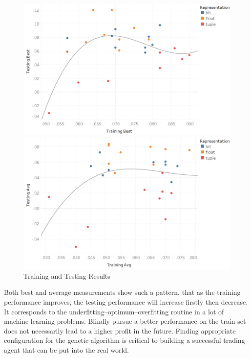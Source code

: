 \documentclass{article}
\begin{document}
\begin{figure}[H]
    \centering
        \begin{minipage}[t]{0.49\textwidth}
            \centering
            \includegraphics[width=\textwidth]{best.png}
        \end{minipage}
        \begin{minipage}[t]{0.49\textwidth}
            \centering
            \includegraphics[width=\textwidth]{avg.png}
        \end{minipage}
        \caption{Training and Testing Results}
\end{figure}

Both best and average measurements show such a pattern,
that as the training performance improves,
the testing performance will increase firstly then decrease.
It corresponds to the underfitting--optimum--overfitting routine in a lot of machine learning problems.
Blindly pursue a better performance on the train set does not necessarily lead to
a higher profit in the future.
Finding appropriate configuration for the genetic algorithm is critical to building
a successful trading agent that can be put into the real world.
\end{document}
